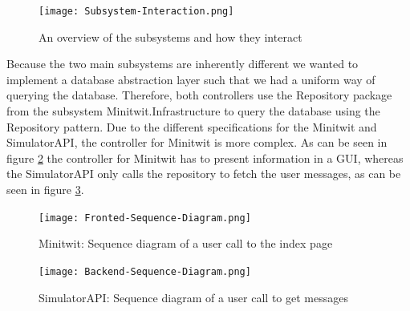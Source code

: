 \begin{figure}[H]
    \begin{center}
        \texttt{[image: Subsystem-Interaction.png]}
    \end{center}
    \caption{An overview of the subsystems and how they interact}
    \label{fig:subsystem-interaction}
\end{figure}

Because the two main subsystems are inherently different we wanted to implement a database abstraction layer such that we had a uniform way of querying the database. Therefore, both controllers use the Repository package from the subsystem Minitwit.Infrastructure to query the database using the Repository pattern.
Due to the different specifications for the Minitwit and SimulatorAPI, the controller for Minitwit is more complex. As can be seen in figure \ref{fig:frontend-interaction} the controller for Minitwit has to present information in a GUI, whereas the SimulatorAPI only calls the repository to fetch the user messages, as can be seen in figure \ref{fig:backend-interaction}.
\begin{figure}[H]
    \begin{center}
        \texttt{[image: Fronted-Sequence-Diagram.png]}
    \end{center}
    \caption{Minitwit: Sequence diagram of a user call to the index page}
    \label{fig:frontend-interaction}
\end{figure}
\begin{figure}[H]
    \begin{center}
        \texttt{[image: Backend-Sequence-Diagram.png]}
    \end{center}
    \caption{SimulatorAPI: Sequence diagram of a user call to get messages}
    \label{fig:backend-interaction}
\end{figure}


